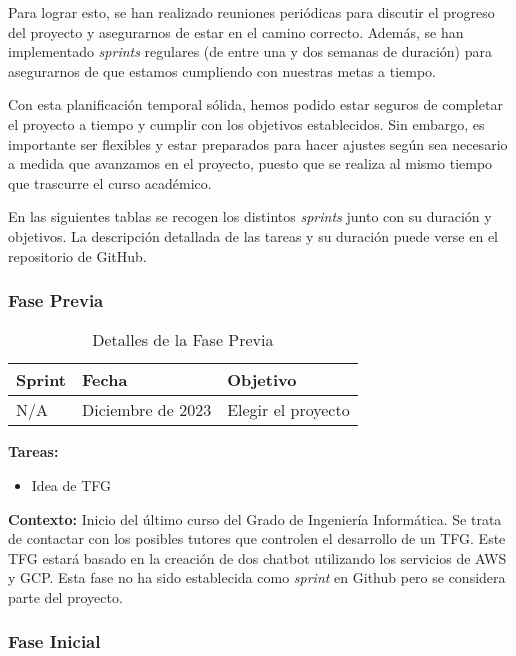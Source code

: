 Para lograr esto, se han realizado reuniones periódicas para discutir el progreso
del proyecto y asegurarnos de estar en el camino correcto. Además, se han implementado
\textit{sprints} regulares (de entre una y dos semanas de duración) para
asegurarnos de que estamos cumpliendo con nuestras metas a tiempo.

Con esta planificación temporal sólida, hemos podido estar seguros de completar
el proyecto a tiempo y cumplir con los objetivos establecidos. Sin embargo, es importante
ser flexibles y estar preparados para hacer ajustes según sea necesario a medida
que avanzamos en el proyecto, puesto que se realiza al mismo tiempo que
trascurre el curso académico.

En las siguientes tablas se recogen los distintos \textit{sprints} junto con su duración
y objetivos. La descripción detallada de las tareas y su duración puede verse en
el repositorio de GitHub.

\subsubsection{Fase Previa}

\begin{table}[h]
	\centering
	\begin{tabularx}
		{\textwidth}{l X X} \toprule \textbf{Sprint} & \textbf{Fecha} & \textbf{Objetivo}
		\\ \midrule N/A & Diciembre de 2023 & Elegir el proyecto \\ \bottomrule
	\end{tabularx}
	\caption{Detalles de la Fase Previa}
	\label{tab:fase-previa}
\end{table}

\textbf{Tareas:}
\begin{itemize}
	\item Idea de TFG
\end{itemize}

\textbf{Contexto:} Inicio del último curso del Grado de Ingeniería Informática.
Se trata de contactar con los posibles tutores que controlen el desarrollo de un
TFG. Este TFG estará basado en la creación de dos chatbot utilizando los servicios
de AWS y GCP. Esta fase no ha sido establecida como \textit{sprint} en Github pero
se considera parte del proyecto.

\subsubsection{Fase Inicial}

